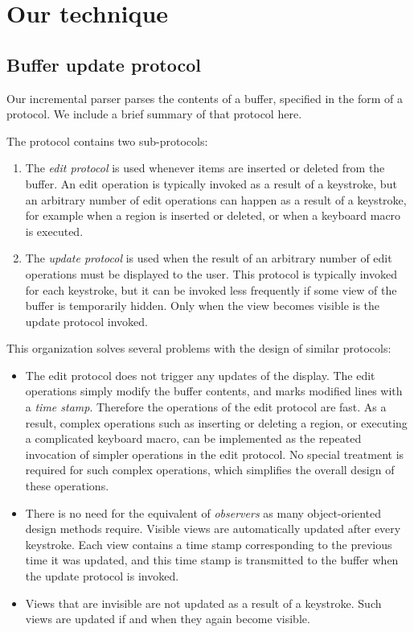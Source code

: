 \section{Our technique}

\subsection{Buffer update protocol}
\label{sec-buffer-update-protocol}

Our incremental parser parses the contents of a buffer, specified in
the form of a \clos{} protocol\cite{Strandh:2016:CPE:3005729.3005732}.
We include a brief summary of that protocol here.

The protocol contains two sub-protocols:

\begin{enumerate}
\item The \emph{edit protocol} is used whenever items are inserted or
  deleted from the buffer.  An edit operation is typically invoked as
  a result of a keystroke, but an arbitrary number of edit operations
  can happen as a result of a keystroke, for example when a region is
  inserted or deleted, or when a keyboard macro is executed.
\item The \emph{update protocol} is used when the result of an
  arbitrary number of edit operations must be displayed to the user.
  This protocol is typically invoked for each keystroke, but it can be
  invoked less frequently if some view of the buffer is temporarily
  hidden.  Only when the view becomes visible is the update protocol
  invoked.
\end{enumerate}

This organization solves several problems with the design of similar
protocols:

\begin{itemize}
\item The edit protocol does not trigger any updates of the display.
  The edit operations simply modify the buffer contents, and marks
  modified lines with a \emph{time stamp}.  Therefore the operations
  of the edit protocol are fast.  As a result, complex operations such
  as inserting or deleting a region, or executing a complicated
  keyboard macro, can be implemented as the repeated invocation of
  simpler operations in the edit protocol.  No special treatment is
  required for such complex operations, which simplifies the overall
  design of these operations.
\item There is no need for the equivalent of \emph{observers} as many
  object-oriented design methods require.  Visible views are
  automatically updated after every keystroke.  Each view contains a
  time stamp corresponding to the previous time it was updated, and
  this time stamp is transmitted to the buffer when the update
  protocol is invoked.
\item Views that are invisible are not updated as a result of a
  keystroke.  Such views are updated if and when they again become
  visible.
\end{itemize}

